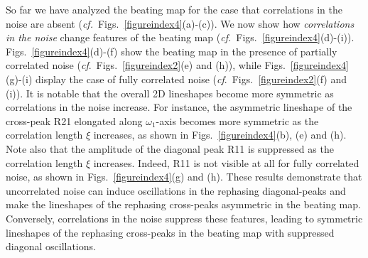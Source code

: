 \documentclass[%
 reprint,%
 amssymb, amsmath,%
 aip,cha,%
]{revtex4-1}
\begin{document}
So far we have analyzed the beating map for the case that correlations in the noise are absent ({\it cf.}~Figs.~\ref{figureindex4}(a)-(c)). We now show how {\it correlations in the noise} change features of the beating map ({\it cf.}~Figs.~\ref{figureindex4}(d)-(i)). Figs.~\ref{figureindex4}(d)-(f) show the beating map in the presence of partially correlated noise ({\it cf}.~Figs.~\ref{figureindex2}(e) and (h)), while Figs.~\ref{figureindex4}(g)-(i) display the case of fully correlated noise ({\it cf}.~Figs.~\ref{figureindex2}(f) and (i)). It is notable that the overall 2D lineshapes become more symmetric as correlations in the noise increase. For instance, the asymmetric lineshape of the cross-peak R21 elongated along $\omega_1$-axis becomes more symmetric as the correlation length $\xi$ increases, as shown in Figs.~\ref{figureindex4}(b), (e) and (h). Note also that the amplitude of the diagonal peak R11 is suppressed as the correlation length $\xi$ increases.  Indeed, R11 is not visible at all for fully correlated noise, as shown in Figs.~\ref{figureindex4}(g) and (h). These results demonstrate that uncorrelated noise can induce oscillations in the rephasing diagonal-peaks and make the lineshapes of the rephasing cross-peaks asymmetric in the beating map. Conversely, correlations in the noise suppress these features, leading to symmetric lineshapes of the rephasing cross-peaks in the beating map with suppressed diagonal oscillations.
\end{document}
